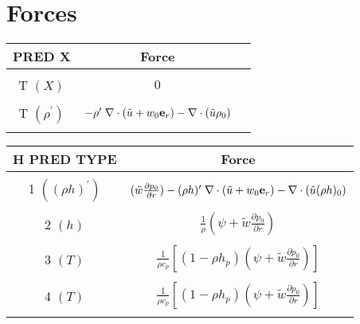 \documentclass[11pt]{article}
\def\eb    {{\bf e}}
\def\ut    {\tilde{u}}
\begin{document}
\section{Forces}
\begin{table*}
\begin{center}
\caption{Forcing term into make edge scal \newline}
\begin{tabular}{|c|c|c|}
\multicolumn{1}{c}{PRED X}   & \multicolumn{1}{c}{Force} \\
\hline
  &   \\
T $(X)$ & $0$ \\
  &   \\
T $(\rho^\prime)$ & $-\rho^\prime \; \nabla \cdot (\ut+w_0 \eb_r) - \nabla \cdot (\ut \rho_0) $  \\
  &   \\
\hline
\end{tabular}
\end{center}
\begin{center}
\begin{tabular}{|c|c|}
\multicolumn{1}{c}{H PRED TYPE}   & \multicolumn{1}{c}{Force} \\
\hline
   & \\
 1 $((\rho h)^\prime)$ &  $(\tilde{w} \frac{\partial p_0}{\partial r}) - (\rho h)^\prime \; \nabla \cdot (\ut+w_0 \eb_r) - \nabla \cdot (\ut (\rho h)_0) $  \\
   & \\
 2 $(h)$ & $\frac{1}{\rho} (\psi + \tilde{w} \frac{\partial p_0}{\partial r})$  \\
   & \\
 3 $(T)$ & $\frac{1}{\rho c_p} \left[ (1 - \rho h_p) (\psi + \tilde{w} \frac{\partial p_0}{\partial r}) \right]$ \\
   & \\
 4 $(T)$ & $\frac{1}{\rho c_p} \left[ (1 - \rho h_p) (\psi + \tilde{w} \frac{\partial p_0}{\partial r}) \right]$ \\
   & \\
\hline
\hline
\end{tabular}
\end{center}
\end{table*}
\end{document}
